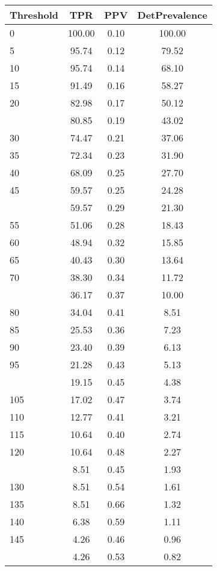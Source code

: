 \begin{table}[ht]
\centering
\begin{tabular}{lccc}
  \toprule
Threshold & TPR & PPV & DetPrevalence \\ 
  \midrule
0 & 100.00 & 0.10 & 100.00 \\ 
  5 & 95.74 & 0.12 & 79.52 \\ 
  10 & 95.74 & 0.14 & 68.10 \\ 
  15 & 91.49 & 0.16 & 58.27 \\ 
  20 & 82.98 & 0.17 & 50.12 \\ 
   \addlinespace
25 & 80.85 & 0.19 & 43.02 \\ 
  30 & 74.47 & 0.21 & 37.06 \\ 
  35 & 72.34 & 0.23 & 31.90 \\ 
  40 & 68.09 & 0.25 & 27.70 \\ 
  45 & 59.57 & 0.25 & 24.28 \\ 
   \addlinespace
50 & 59.57 & 0.29 & 21.30 \\ 
  55 & 51.06 & 0.28 & 18.43 \\ 
  60 & 48.94 & 0.32 & 15.85 \\ 
  65 & 40.43 & 0.30 & 13.64 \\ 
  70 & 38.30 & 0.34 & 11.72 \\ 
   \addlinespace
75 & 36.17 & 0.37 & 10.00 \\ 
  80 & 34.04 & 0.41 & 8.51 \\ 
  85 & 25.53 & 0.36 & 7.23 \\ 
  90 & 23.40 & 0.39 & 6.13 \\ 
  95 & 21.28 & 0.43 & 5.13 \\ 
   \addlinespace
100 & 19.15 & 0.45 & 4.38 \\ 
  105 & 17.02 & 0.47 & 3.74 \\ 
  110 & 12.77 & 0.41 & 3.21 \\ 
  115 & 10.64 & 0.40 & 2.74 \\ 
  120 & 10.64 & 0.48 & 2.27 \\ 
   \addlinespace
125 & 8.51 & 0.45 & 1.93 \\ 
  130 & 8.51 & 0.54 & 1.61 \\ 
  135 & 8.51 & 0.66 & 1.32 \\ 
  140 & 6.38 & 0.59 & 1.11 \\ 
  145 & 4.26 & 0.46 & 0.96 \\ 
   \addlinespace
150 & 4.26 & 0.53 & 0.82 \\ 

\end{tabular}
\end{table}
